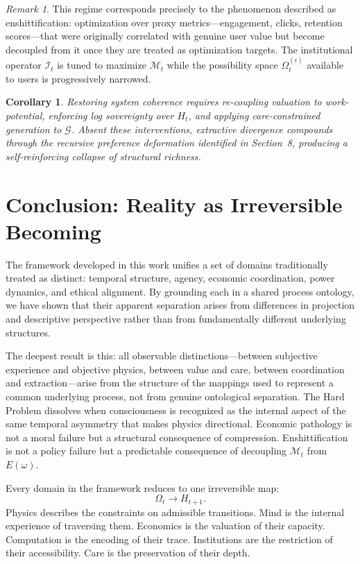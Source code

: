 \documentclass[11pt,a4paper]{article}
\newtheorem{corollary}[theorem]{Corollary}
\theoremstyle{definition}
\theoremstyle{remark}
\newtheorem{remark}[theorem]{Remark}
\begin{document}
\begin{remark}
This regime corresponds precisely to the phenomenon described as enshittification: optimization over proxy metrics---engagement, clicks, retention scores---that were originally correlated with genuine user value but become decoupled from it once they are treated as optimization targets. The institutional operator $\mathcal{I}_t$ is tuned to maximize $\mathcal{M}_t$ while the possibility space $\Omega_t^{(i)}$ available to users is progressively narrowed.
\end{remark}

\begin{corollary}
Restoring system coherence requires re-coupling valuation to work-potential, enforcing log sovereignty over $H_t$, and applying care-constrained generation to $\mathcal{G}$. Absent these interventions, extractive divergence compounds through the recursive preference deformation identified in Section~8, producing a self-reinforcing collapse of structural richness.
\end{corollary}

\section{Conclusion: Reality as Irreversible Becoming}

The framework developed in this work unifies a set of domains traditionally treated as distinct: temporal structure, agency, economic coordination, power dynamics, and ethical alignment. By grounding each in a shared process ontology, we have shown that their apparent separation arises from differences in projection and descriptive perspective rather than from fundamentally different underlying structures.

The deepest result is this: all observable distinctions---between subjective experience and objective physics, between value and care, between coordination and extraction---arise from the structure of the mappings used to represent a common underlying process, not from genuine ontological separation. The Hard Problem dissolves when consciousness is recognized as the internal aspect of the same temporal asymmetry that makes physics directional. Economic pathology is not a moral failure but a structural consequence of compression. Enshittification is not a policy failure but a predictable consequence of decoupling $\mathcal{M}_t$ from $E(\omega)$.

Every domain in the framework reduces to one irreversible map:
\[
\Omega_t \longrightarrow H_{t+1}.
\]
Physics describes the constraints on admissible transitions. Mind is the internal experience of traversing them. Economics is the valuation of their capacity. Computation is the encoding of their trace. Institutions are the restriction of their accessibility. Care is the preservation of their depth.
\end{document}
